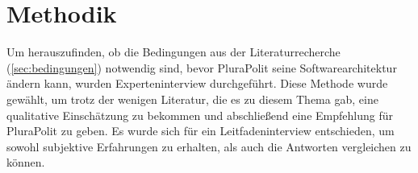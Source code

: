 \section{Methodik}
\label{sec:methodik}


Um herauszufinden, ob die Bedingungen aus der Literaturrecherche (\cref{sec:bedingungen}) notwendig sind, bevor PluraPolit seine Softwarearchitektur ändern kann, wurden Experteninterview durchgeführt. Diese Methode wurde gewählt, um trotz der wenigen Literatur, die es zu diesem Thema gab, eine qualitative Einschätzung zu bekommen und abschließend eine Empfehlung für PluraPolit zu geben. Es wurde sich für ein Leitfadeninterview entschieden, um sowohl subjektive Erfahrungen zu erhalten, als auch die Antworten vergleichen zu können.









